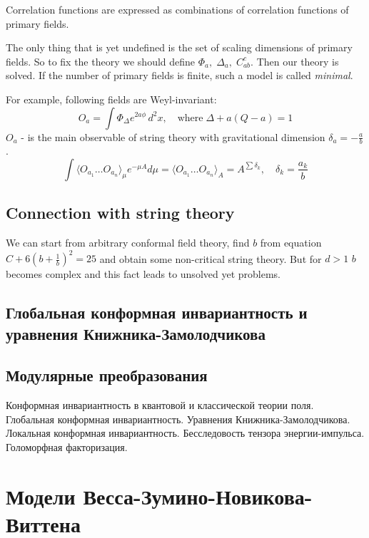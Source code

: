 \documentclass[a4paper,12pt]{article}
\theoremstyle{definition} \newtheorem{Def}{Definition}
\begin{document}
Correlation functions are expressed as combinations of correlation functions of primary fields.

The only thing that is yet undefined is the set of scaling dimensions of primary fields. So to fix the theory we should define $\Phi_a,\; \Delta_a,\; C^c_{ab}$. Then our theory is solved. If the number of primary fields is finite, such a model is called {\it minimal}.

For example, following fields are Weyl-invariant:
\begin{equation}
  \label{eq:68}
  O_a=\int \Phi_{\Delta}e^{2a\phi}\,d^2x,\quad \mbox{where}\;\Delta+a(Q-a)=1
\end{equation}
$O_a$ - is the main observable of string theory with gravitational dimension $\delta_a=-\frac{a}{b}$.
\begin{equation}
  \label{eq:69}
  \int\langle O_{a_1}\dots O_{a_n}\rangle_{\mu} e^{-\mu A}d\mu=\langle O_{a_1}\dots O_{a_n}\rangle_{A}=A^{\sum \delta_k},\quad \delta_k=\frac{a_k}{b}
\end{equation}
\subsection{Connection with string theory}

We can start from arbitrary conformal field theory, find $b$ from equation $C+6\left(b+\frac{1}{b}\right)^2=25$ and obtain some non-critical string theory. But for $d>1$ $b$ becomes complex and this fact leads to unsolved yet problems.

\subsection{Глобальная конформная инвариантность и уравнения Книжника-Замолодчикова}
\label{sec:knizhnik-zamolodchikov}

\subsection{Модулярные преобразования}
\label{sec:modular}


Конформная инвариантность в квантовой и классической теории поля.
Глобальная конформная инвариантность.
Уравнения Книжника-Замолодчикова.
Локальная конформная инвариантность. Бесследовость тензора энергии-импульса.
Голоморфная факторизация.

\section{Модели Весса-Зумино-Новикова-Виттена}
\label{sec:WZNW}
\end{document}

